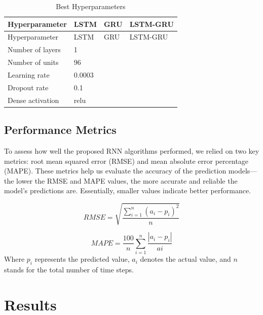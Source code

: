 \documentclass[]{interact}
\theoremstyle{plain}%
\theoremstyle{definition}
\theoremstyle{remark}
\begin{document}
\begin{longtable}[]{@{}llll@{}}
\caption{Best Hyperparameters}\tabularnewline
\toprule\noalign{}
Hyperparameter & LSTM & GRU & LSTM-GRU \\
\midrule\noalign{}
\endfirsthead
\toprule\noalign{}
Hyperparameter & LSTM & GRU & LSTM-GRU \\
\midrule\noalign{}
\endhead
\bottomrule\noalign{}
\endlastfoot
Number of layers & 1 & & \\
Number of units & 96 & & \\
Learning rate & 0.0003 & & \\
Dropout rate & 0.1 & & \\
Dense activation & relu & & \\
\end{longtable}

\subsection{Performance Metrics}\label{performance-metrics}

To assess how well the proposed RNN algorithms performed, we relied on
two key metrics: root mean squared error (RMSE) and mean absolute error
percentage (MAPE). These metrics help us evaluate the accuracy of the
prediction models---the lower the RMSE and MAPE values, the more
accurate and reliable the model's predictions are. Essentially, smaller
values indicate better performance.

\begin{equation}
RMSE = \sqrt{\dfrac{\sum_{i=1}^n (a_i-p_i)^2}{n} }
\end{equation}

\begin{equation}
MAPE = \dfrac{100}{n}\sum_{i=1}^n \dfrac{|a_i-p_i|}{ai}
\end{equation} Where \(p_i\) represents the predicted value, \(a_i\)
denotes the actual value, and \(n\) stands for the total number of time
steps.

\section{Results}\label{results}
\end{document}
